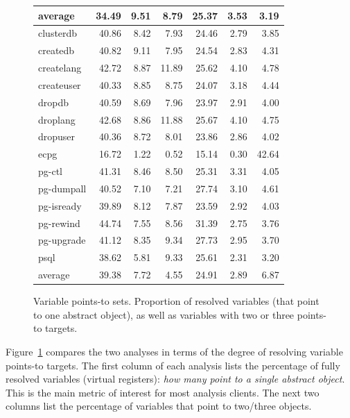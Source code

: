 \begin{figure}[t]
\begin{tabular}{l r@{\quad}rr r@{\quad}rr}
    \midrule
    average  & 34.49 &  9.51 & 8.79 & 25.37 & 3.53 & 3.19 \\
    \midrule
    clusterdb  & 40.86 & 8.42 &  7.93 & 24.46 & 2.79 &  3.85 \\
    createdb   & 40.82 & 9.11 &  7.95 & 24.54 & 2.83 &  4.31 \\
    createlang & 42.72 & 8.87 & 11.89 & 25.62 & 4.10 &  4.78 \\
    createuser & 40.33 & 8.85 &  8.75 & 24.07 & 3.18 &  4.44 \\
    dropdb     & 40.59 & 8.69 &  7.96 & 23.97 & 2.91 &  4.00 \\
    droplang   & 42.68 & 8.86 & 11.88 & 25.67 & 4.10 &  4.75 \\
    dropuser   & 40.36 & 8.72 &  8.01 & 23.86 & 2.86 &  4.02 \\
    ecpg       & 16.72 & 1.22 &  0.52 & 15.14 & 0.30 & 42.64 \\
    pg-ctl     & 41.31 & 8.46 &  8.50 & 25.31 & 3.31 &  4.05 \\
    pg-dumpall & 40.52 & 7.10 &  7.21 & 27.74 & 3.10 &  4.61 \\
    pg-isready & 39.89 & 8.12 &  7.87 & 23.59 & 2.92 &  4.03 \\
    pg-rewind  & 44.74 & 7.55 &  8.56 & 31.39 & 2.75 &  3.76 \\
    pg-upgrade & 41.12 & 8.35 &  9.34 & 27.73 & 2.95 &  3.70 \\
    psql       & 38.62 & 5.81 &  9.33 & 25.61 & 2.31 &  3.20 \\
    \midrule
    average    & 39.38 & 7.72 &  4.55 & 24.91 & 2.89 &  6.87 \\
    \bottomrule
  \end{tabular}
  \caption[Variable points-to sets]{%
    Variable points-to sets. Proportion of resolved variables (that
    point to one abstract object), as well as variables with two or
    three points-to targets.}
  \label{structsens/fig/stats:var}
\end{figure}

Figure~\ref{structsens/fig/stats:var} compares the two analyses in
terms of the degree of resolving variable points-to targets. The first
column of each analysis lists the percentage of fully resolved
variables (virtual registers): \emph{how many point to a single
  abstract object}. This is the main metric of interest for most
analysis clients. The next two columns list the percentage of
variables that point to two/three objects.

